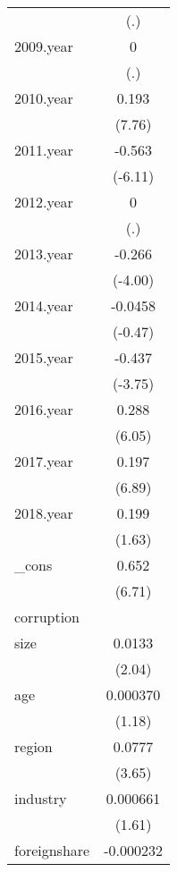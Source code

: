 {\begin{tabular}{l*{1}{c}}
            &         (.)         \\
[1em]
2009.year   &           0         \\
            &         (.)         \\
[1em]
2010.year   &       0.193\sym{***}\\
            &      (7.76)         \\
[1em]
2011.year   &      -0.563\sym{***}\\
            &     (-6.11)         \\
[1em]
2012.year   &           0         \\
            &         (.)         \\
[1em]
2013.year   &      -0.266\sym{***}\\
            &     (-4.00)         \\
[1em]
2014.year   &     -0.0458         \\
            &     (-0.47)         \\
[1em]
2015.year   &      -0.437\sym{***}\\
            &     (-3.75)         \\
[1em]
2016.year   &       0.288\sym{***}\\
            &      (6.05)         \\
[1em]
2017.year   &       0.197\sym{***}\\
            &      (6.89)         \\
[1em]
2018.year   &       0.199         \\
            &      (1.63)         \\
[1em]
\_cons      &       0.652\sym{***}\\
            &      (6.71)         \\
\hline
corruption  &                     \\
size        &      0.0133\sym{*}  \\
            &      (2.04)         \\
[1em]
age         &    0.000370         \\
            &      (1.18)         \\
[1em]
region      &      0.0777\sym{***}\\
            &      (3.65)         \\
[1em]
industry    &    0.000661         \\
            &      (1.61)         \\
[1em]
foreignshare&   -0.000232         \\

\end{tabular}}
